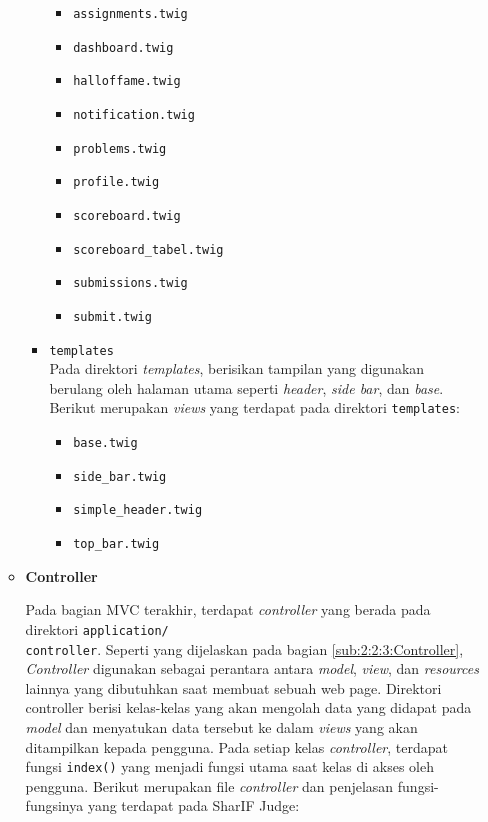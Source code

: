 \documentclass[a4paper,twoside]{article}
\begin{document}
\begin{enumerate}
\begin{itemize}
\begin{itemize}
\begin{itemize}
				                  \item \verb|assignments.twig|
				                  \item \verb|dashboard.twig|
				                  \item \verb|halloffame.twig|
				                  \item \verb|notification.twig|
				                  \item \verb|problems.twig|
				                  \item \verb|profile.twig|
				                  \item \verb|scoreboard.twig|
				                  \item \verb|scoreboard_tabel.twig|
				                  \item \verb|submissions.twig|
				                  \item \verb|submit.twig|
			                  \end{itemize}

			            \item \verb|templates| \\
			                  Pada direktori \textit{templates}, berisikan tampilan yang digunakan berulang oleh halaman utama seperti \textit{header}, \textit{side bar}, dan \textit{base}. Berikut merupakan \textit{views} yang terdapat pada direktori \verb|templates|:

			                  \begin{itemize}
				                  \item \verb|base.twig|
				                  \item \verb|side_bar.twig|
				                  \item \verb|simple_header.twig|
				                  \item \verb|top_bar.twig|
			                  \end{itemize}

		            \end{itemize}

		      \item \textbf{Controller}
		            \label{sub:3:1:1:controller}

		            Pada bagian MVC terakhir, terdapat \textit{controller} yang berada pada direktori \verb|application/| \\ \verb|controller|. Seperti yang dijelaskan pada bagian \ref{sub:2:2:3:Controller}, \textit{Controller} digunakan sebagai perantara antara \textit{model}, \textit{view}, dan \textit{resources} lainnya yang dibutuhkan saat membuat sebuah web page. Direktori controller berisi kelas-kelas yang akan mengolah data yang didapat pada \textit{model} dan menyatukan data tersebut ke dalam \textit{views} yang akan ditampilkan kepada pengguna. Pada setiap kelas \textit{controller}, terdapat fungsi \verb|index()| yang menjadi fungsi utama saat kelas di akses oleh pengguna. Berikut merupakan file \textit{controller} dan penjelasan fungsi-fungsinya yang terdapat pada SharIF Judge:


\end{itemize}
\end{enumerate}
\end{document}
